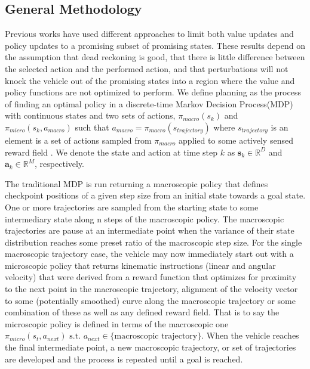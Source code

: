 \documentclass[12pt]{article}
\begin{document}
\subsection{General Methodology}
Previous works have used different approaches to limit both value updates and policy updates to a promising subset of promising states. These results depend on the assumption that dead reckoning is good, that there is little difference between the selected action and the performed action, and that perturbations will not knock the vehicle out of the promising states into a region where the value and policy functions are not optimized to perform.
\newline
We define planning as the process of finding an optimal policy in a discrete-time Markov Decision Process(MDP) with continuous states and two sets of actions, $\pi_{macro}(s_k)$ and $\pi_{micro}(s_k,a_{macro})$ such that $a_{macro} = \pi_{macro}(s_{trajectory})$ where $s_{trajectory}$ is an element is a set of actions sampled from $\pi_{macro}$ applied to some actively sensed reward field . We denote the state and action at time step $k$ as $\mathbf{s}_k \in \mathbb{R}^D$ and $\mathbf{a}_k \in \mathbb{R}^M$, respectively.

The  traditional MDP is run returning a macroscopic policy that defines checkpoint positions of a given step size from an initial state towards a goal state. One or more trajectories are sampled from the starting state to some intermediary state along n steps of the macroscopic policy. The macroscopic trajectories are pause at an intermediate point when the variance of their state distribution reaches some preset ratio of the macroscopic step size. For the single macroscopic trajectory case, the vehicle may now immediately start out with a microscopic policy that returns kinematic instructions (linear and angular velocity) that were derived from a reward function that optimizes for proximity to the next point in the  macroscopic trajectory, alignment of the velocity vector to some (potentially smoothed) curve along the macroscopic trajectory or some combination of these as well as any defined reward field. That is to say the microscopic policy is defined in terms of the macroscopic one $\pi_{micro}(s_t,a_{next}) \textrm{ s.t. } a_{next} \in \{\textrm{macroscopic trajectory}\}$. When the vehicle reaches the final intermediate point, a new macroscopic trajectory, or set of trajectories are developed and the process is repeated until a goal is reached.
\end{document}
